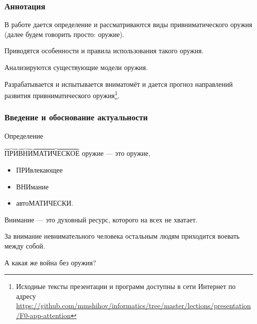 \begin{frame}
    \frametitle{Аннотация}
    
    В работе дается определение и рассматриваются виды \alert{привниматического оружия} (далее будем говорить просто: \alert{оружие}). 
    
    \par\bigskip
    
    Приводятся \alert{особенности и правила} использования такого оружия. 
    
    \par\bigskip

    Анализируются \alert{существующие модели} оружия. 

    \par\bigskip
    
    Разрабатывается и испытывается вниматомёт \alert{\myDevice} и дается прогноз направлений развития привниматического оружия\footnote{Исходные тексты презентации и программ доступны в сети Интернет по адресу \url{https://github.com/mmshihov/informatics/tree/master/lections/presentation/F0-app-attention}}.
\end{frame}

\begin{frame}
    \frametitle{Введение и обоснование актуальности}
    
    \begin{block}{Определение}
        \par\bigskip
        \alert{$\overbrace{\text{ПРИ}}\overbrace{\text{ВНИ}}\overbrace{\text{МАТИЧЕСКОЕ}}$} оружие --- это оружие, 
        \begin{itemize}
            \item \alert{ПРИ}влекающее 
            \item \alert{ВНИ}мание 
            \item авто\alert{МАТИЧЕСКИ}.
        \end{itemize}
    \end{block}
    
    
    \alert{Внимание} --- это духовный ресурс, которого на всех не хватает. 

    \par\bigskip

    За внимание невнимательного человека остальным людям приходится воевать между собой. 

    \par\bigskip

    А какая же война без \alert{оружия}?
\end{frame}
    
